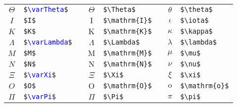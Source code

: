 \begin{table}[h]
\begin{tabular}{c p{15ex} p{5ex} c p{15ex} p{5ex} c p{15ex}}
	$\varTheta$   & \texttt{\$\textcolor{blue}{\textbackslash varTheta}\$}   &&
	$\Theta$      & \verb|$\Theta$|                                          &&
	$\theta$      & \verb|$\theta$|                                          \\

	$I$           & \verb|$I$|                                               &&
	$\mathrm{I}$  & \verb|$\mathrm{I}$|                                      &&
	$\iota$       & \verb|$\iota$|                                           \\

	$K$           & \verb|$K$|                                               &&
	$\mathrm{K}$  & \verb|$\mathrm{K}$|                                      &&
	$\kappa$      & \verb|$\kappa$|                                          \\

	$\varLambda$  & \texttt{\$\textcolor{blue}{\textbackslash varLambda}\$}  &&
	$\Lambda$     & \verb|$\Lambda$|                                         &&
	$\lambda$     & \verb|$\lambda$|                                         \\

	$M$           & \verb|$M$|                                               &&
	$\mathrm{M}$  & \verb|$\mathrm{M}$|                                      &&
	$\mu$         & \verb|$\mu$|                                             \\

	$N$           & \verb|$N$|                                               &&
	$\mathrm{N}$  & \verb|$\mathrm{N}$|                                      &&
	$\nu$         & \verb|$\nu$|                                             \\

	$\varXi$      & \texttt{\$\textcolor{blue}{\textbackslash varXi}\$}      &&
	$\Xi$         & \verb|$\Xi$|                                             &&
	$\xi$         & \verb|$\xi$|                                             \\

	$O$           & \verb|$O$|                                               &&
	$\mathrm{O}$  & \verb|$\mathrm{O}$|                                      &&
	$\mathrm{o}$  & \verb|$\mathrm{o}$|                                      \\

	$\varPi$      & \texttt{\$\textcolor{blue}{\textbackslash varPi}\$}      &&
	$\Pi$         & \verb|$\Pi$|                                             &&
	$\pi$         & \verb|$\pi$|                                             \\


\end{tabular}
\end{table}
